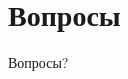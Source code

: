 \documentclass{beamer}
\begin{document}
\section{Вопросы}

\begin{frame}
\Huge{\centerline{Вопросы?}}
\end{frame}

\end{document}
